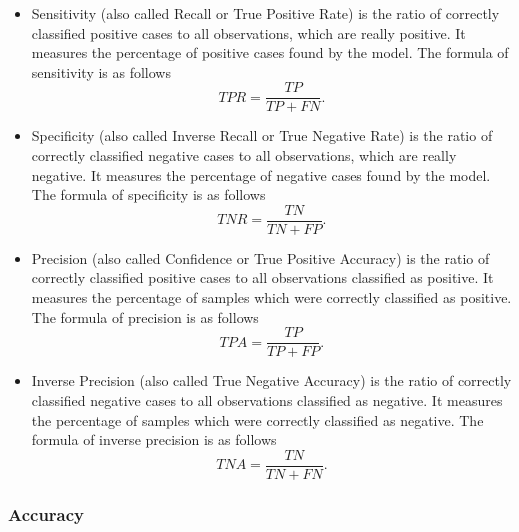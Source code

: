 \documentclass[english]{pwr_wmat_praca_dyplomowa}
\theoremstyle{plain}
\numberwithin{theorem}{chapter}
\theoremstyle{definition}
\numberwithin{theorem}{chapter}
\begin{document}
	\begin{itemize}
		\item Sensitivity (also called Recall or True Positive Rate) is the ratio of correctly classified positive cases to all observations, which are really positive. It measures the percentage of positive cases found by the model. The formula of sensitivity is as follows
		$$ TPR = \frac{TP}{TP + FN}. $$
		\item Specificity (also called Inverse Recall or True Negative Rate) is the ratio of correctly classified negative cases to all observations, which are really negative. It measures the percentage of negative cases found by the model. The formula of specificity is as follows
		$$ TNR = \frac{TN}{TN + FP}. $$
		\item Precision (also called Confidence or True Positive Accuracy) is the ratio of correctly classified positive cases to all observations classified as positive. It measures the percentage of samples which were correctly classified as positive. The formula of precision is as follows
		$$ TPA = \frac{TP}{TP + FP}. $$
		\item Inverse Precision (also called True Negative Accuracy) is the ratio of correctly classified negative cases to all observations classified as negative. It measures the percentage of samples which were correctly classified as negative. The formula of inverse precision is as follows
		$$ TNA = \frac{TN}{TN + FN}. $$
	\end{itemize}
	
	\subsubsection{Accuracy}
	
\end{document}
